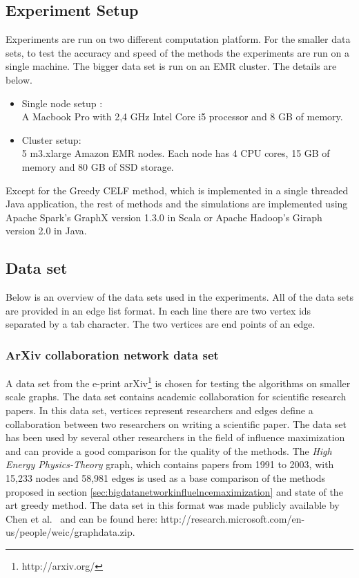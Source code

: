 \documentclass[english]{tktltiki}
\begin{document}
\subsection{Experiment Setup}
Experiments are run on two different computation platform. For the smaller data sets, to test the accuracy and speed of the methods the experiments are run on a single machine. The bigger data set is run on an EMR cluster. The details are below. 

\begin{itemize}
\item Single node setup : \\
A Macbook Pro with 2,4 GHz Intel Core i5 processor and 8 GB of memory. 
\item Cluster setup: \\
5 m3.xlarge Amazon EMR nodes. Each node has 4 CPU cores, 15 GB of memory and 80 GB of SSD storage.
\end{itemize}
Except for the Greedy CELF method, which is implemented in a single threaded Java application, the rest of methods and the simulations are implemented using Apache Spark's GraphX version 1.3.0 in Scala or Apache Hadoop's Giraph version 2.0 in Java. 


\subsection{Data set}
Below is an overview of the data sets used in the experiments. All of the data sets are provided in an edge list format. In each line there are two vertex ids separated by a tab character. The two vertices are end points of an edge. 
\subsubsection{ArXiv collaboration network data set}
A data set from the e-print arXiv\footnote{http://arxiv.org/} is chosen for testing the algorithms on smaller scale graphs. The data set contains academic collaboration for scientific research papers. In this data set, vertices represent researchers and edges define a collaboration between two researchers on writing a scientific paper. The data set has been used by several other researchers in the field of influence maximization and can provide a good comparison for the quality of the methods. The \textit{High Energy Physics-Theory} graph, which contains papers from 1991 to 2003, with 15,233 nodes and 58,981 edges is used as a base comparison of the methods proposed in section \ref{sec:bigdatanetworkinfluelncemaximization} and state of the art greedy method. The data set in this format was made publicly available by Chen et al.\ \cite{chen09} and can be found here: http://research.microsoft.com/en-us/people/weic/graphdata.zip. 
\end{document}
